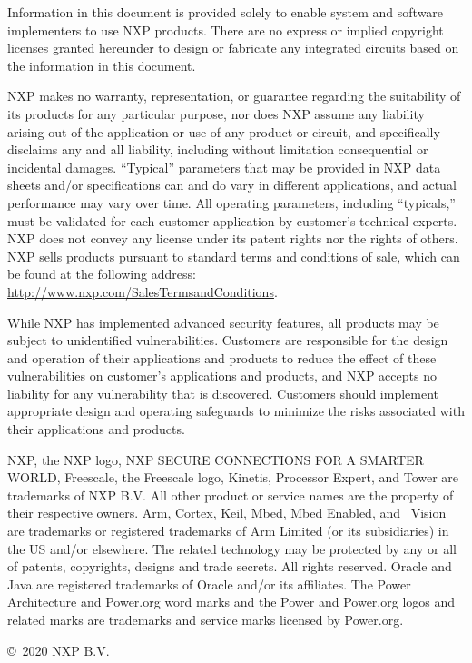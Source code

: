 \begin{flushleft}
\textsf{Information in this document is provided solely to enable system and software implementers to use NXP products. There are no express or implied copyright licenses granted hereunder to design or fabricate any integrated circuits based on the information in this document.}\newline

\textsf{NXP makes no warranty, representation, or guarantee regarding the suitability of its products for any particular purpose, nor does NXP assume any liability arising out of the application or use of any product or circuit, and specifically disclaims any and all liability, including without limitation consequential or incidental damages. “Typical” parameters that may be provided in NXP data sheets and/or specifications can and do vary in different applications, and actual performance may vary over time. All operating parameters, including “typicals,” must be validated for each customer application by customer's technical experts. NXP does not convey any license under its patent rights nor the rights of others. NXP sells products pursuant to standard terms and conditions of sale, which can be found at the following address: \url{http://www.nxp.com/SalesTermsandConditions}.} \newline

\textsf{While NXP has implemented advanced security features, all products may be subject to unidentified vulnerabilities. Customers are responsible for the design and operation of their applications and products to reduce the effect of these vulnerabilities on customer's applications and products, and NXP accepts no liability for any vulnerability that is discovered. Customers should implement appropriate design and operating safeguards to minimize the risks associated with their applications and products.} \newline


\textsf{NXP, the NXP logo, NXP SECURE CONNECTIONS FOR A SMARTER WORLD, Freescale, the Freescale logo, Kinetis, Processor Expert, and Tower are trademarks of NXP B.V. All other product or service names are the property of their respective owners. Arm, Cortex, Keil, Mbed, Mbed Enabled, and ~{\textmu}Vision are trademarks or registered trademarks of Arm Limited (or its subsidiaries) in the US and/or elsewhere. The related technology may be protected by any or all of patents, copyrights, designs and trade secrets. All rights reserved. Oracle and Java are registered trademarks of Oracle and/or its affiliates. The Power Architecture and Power.org word marks and the Power and Power.org logos and related marks are trademarks and service marks licensed by Power.org.} \newline

\textsf{
\copyright~2020 NXP B.V.}
\end{flushleft}


